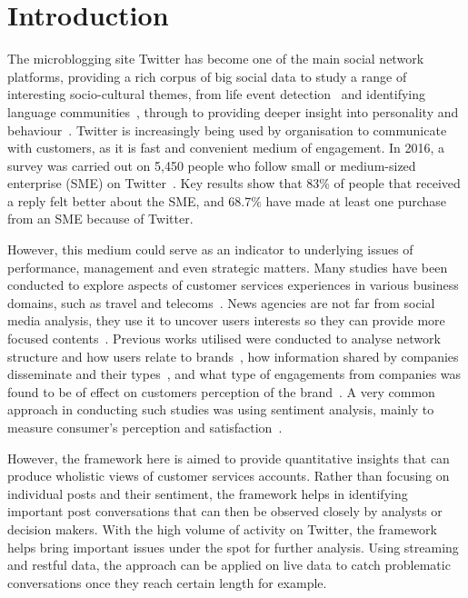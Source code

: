 \documentclass[sigconf]{acmart}
\begin{document}
\section{Introduction}\label{intro}

The microblogging site Twitter has become one of the main social
network platforms, providing a rich corpus of big social data to study
a range of interesting socio-cultural themes, from life event
detection~\cite{blamey-et-al-2013} and identifying language
communities~\cite{albishry-et-al:iccci2017}, through to providing
deeper insight into personality and
behaviour~\cite{mostafa-et-al-ai2016}. Twitter is increasingly being
used by organisation to communicate with customers, as it is fast and
convenient medium of engagement. In 2016, a survey was carried out on
5,450 people who follow small or medium-sized enterprise (SME) on
Twitter~\cite{Twitter2016}. Key results show that 83\% of people that
received a reply felt better about the SME, and 68.7\% have made at
least one purchase from an SME because of Twitter.

However, this medium could serve as an indicator to underlying issues
of performance, management and even strategic matters. Many studies
have been conducted to explore aspects of customer services
experiences in various business domains, such as travel and
telecoms~\cite{Shakeel2017,Zhang2016,Wattimena2017,Guercini2014,Khatoon2017}.
News agencies are not far from social media analysis, they use it to
uncover users interests so they can provide more focused
contents~\cite{Nigam2016}.  Previous works utilised were conducted to
analyse network structure and how users relate to
brands~\cite{Cutler2017}, how information shared by companies
disseminate and their types~\cite{Piccialli2017}, and what type of
engagements from companies was found to be of effect on customers
perception of the brand~\cite{Ibrahim2017}. A very common approach in
conducting such studies was using sentiment analysis, mainly to
measure consumer's perception and
satisfaction~\cite{Zhang2016,Al-Hussaini2017}.

However, the framework here is aimed to provide quantitative insights
that can produce wholistic views of customer services accounts. Rather
than focusing on individual posts and their sentiment, the framework
helps in identifying important post conversations that can then be
observed closely by analysts or decision makers. With the high volume
of activity on Twitter, the framework helps bring important issues
under the spot for further analysis. Using streaming and restful data,
the approach can be applied on live data to catch problematic
conversations once they reach certain length for example.
\end{document}
